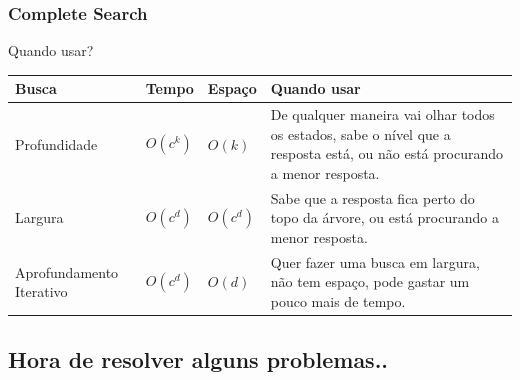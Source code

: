 \begin{frame}
\frametitle{Complete Search}
\begin{block}{Quando usar?}
\begin{table}
    \begin{tabular}{|p{2.5cm}|l|l|p{5cm}|}
        \hline
        Busca                    & Tempo    & Espaço    & Quando usar                                                                                                                \\ \hline
        Profundidade             & $O(c^k)$ & $O(k)$    & De qualquer maneira vai olhar todos os estados, sabe o nível que a resposta está, ou não está procurando a menor resposta. \\ \hline
        Largura                  & $O(c^d)$ & $O(c^d)$  & Sabe que a resposta fica perto do topo da árvore, ou está procurando a menor resposta.                                     \\ \hline
        Aprofundamento Iterativo & $O(c^d)$ & $O(d)$    & Quer fazer uma busca em largura, não tem espaço, pode gastar um pouco mais de tempo.                                       \\
        \hline
    \end{tabular}
\end{table}
\end{block}
\end{frame}

\subsection{Hora de resolver alguns problemas..}

